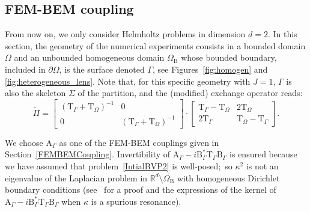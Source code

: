 \documentclass[a4paper,11pt]{article}
\newcommand{\mA}{\mathrm{A}}
\newcommand{\mB}{\mathrm{B}}
\newcommand{\mT}{\mathrm{T}}
\begin{document}
\subsection{FEM-BEM coupling}\label{ssec:fem-bem-strong}
From now on, we only consider Helmholtz problems in dimension \(d=2\). In this section, the geometry of the numerical experiments consists in a bounded domain \(\Omega\) and an unbounded homogeneous domain \(\Omega_{\text{B}}\) whose bounded boundary, included in \(\partial\Omega\), is the surface denoted \(\Gamma\), see Figures~\ref{fig:homogen} and \ref{fig:heterogeneous_lens}. Note that, for this specific geometry with \(J=1\), \(\Gamma\) is also the skeleton \(\Sigma\) of the partition, and the (modified) exchange operator reads:
\begin{equation*}
  \tilde{\Pi} =
  \begin{bmatrix}
      \left(\mT_{\Gamma} + \mT_{\Omega}\right)^{-1} & 0 \\
      0 & \left(\mT_{\Gamma} + \mT_{\Omega}\right)^{-1}
  \end{bmatrix}
  \cdot
  \begin{bmatrix}
      \mT_{\Gamma} - \mT_{\Omega} & 2 \mT_{\Omega} \\
      2 \mT_{\Gamma} & \mT_{\Omega} - \mT_{\Gamma}
  \end{bmatrix}.
\end{equation*}




We choose \(\mA_{\Gamma}\) as one of the FEM-BEM couplings given in Section~\ref{FEMBEMCoupling}. Invertibility of \(\mA_{\Gamma} -i \mB_{\Gamma}^* \mT_{\Gamma} \mB_{\Gamma}\) is ensured because we have assumed that problem~\eqref{IntialBVP2} is well-posed;~so \(\kappa^2\) is not an eigenvalue of the Laplacian problem in \(\mathbb{R}^d \setminus \overline{\Omega_{\text{B}}}\) with homogeneous Dirichlet boundary conditions (see~\cite{BoisneaultBonazzoliEtAl2025SRS} for a proof and the expressions of the kernel of \(\mA_{\Gamma} -i \mB_{\Gamma}^* \mT_{\Gamma} \mB_{\Gamma}\) when \(\kappa\) is a spurious resonance).
\end{document}
